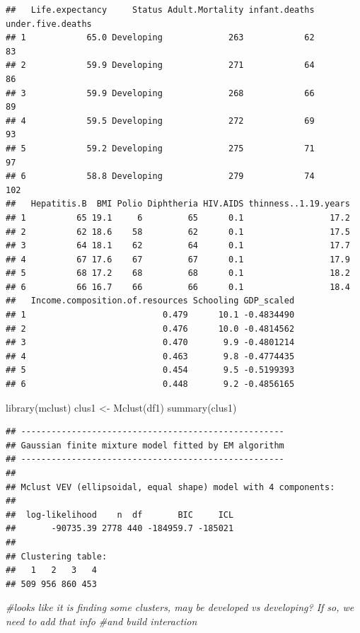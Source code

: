 \documentclass[
]{article}
\newenvironment{Shaded}{\begin{snugshade}}{\end{snugshade}}
\newcommand{\CommentTok}[1]{\textcolor[rgb]{0.56,0.35,0.01}{\textit{#1}}}
\newcommand{\FunctionTok}[1]{\textcolor[rgb]{0.00,0.00,0.00}{#1}}
\newcommand{\NormalTok}[1]{#1}
\newcommand{\OtherTok}[1]{\textcolor[rgb]{0.56,0.35,0.01}{#1}}
\begin{document}
\begin{verbatim}
##   Life.expectancy     Status Adult.Mortality infant.deaths under.five.deaths
## 1            65.0 Developing             263            62                83
## 2            59.9 Developing             271            64                86
## 3            59.9 Developing             268            66                89
## 4            59.5 Developing             272            69                93
## 5            59.2 Developing             275            71                97
## 6            58.8 Developing             279            74               102
##   Hepatitis.B  BMI Polio Diphtheria HIV.AIDS thinness..1.19.years
## 1          65 19.1     6         65      0.1                 17.2
## 2          62 18.6    58         62      0.1                 17.5
## 3          64 18.1    62         64      0.1                 17.7
## 4          67 17.6    67         67      0.1                 17.9
## 5          68 17.2    68         68      0.1                 18.2
## 6          66 16.7    66         66      0.1                 18.4
##   Income.composition.of.resources Schooling GDP_scaled
## 1                           0.479      10.1 -0.4834490
## 2                           0.476      10.0 -0.4814562
## 3                           0.470       9.9 -0.4801214
## 4                           0.463       9.8 -0.4774435
## 5                           0.454       9.5 -0.5199393
## 6                           0.448       9.2 -0.4856165
\end{verbatim}

\begin{Shaded}
\begin{Highlighting}[]
\FunctionTok{library}\NormalTok{(mclust)}
\NormalTok{clus1 }\OtherTok{\textless{}{-}} \FunctionTok{Mclust}\NormalTok{(df1)}
\FunctionTok{summary}\NormalTok{(clus1)}
\end{Highlighting}
\end{Shaded}

\begin{verbatim}
## ---------------------------------------------------- 
## Gaussian finite mixture model fitted by EM algorithm 
## ---------------------------------------------------- 
## 
## Mclust VEV (ellipsoidal, equal shape) model with 4 components: 
## 
##  log-likelihood    n  df       BIC     ICL
##       -90735.39 2778 440 -184959.7 -185021
## 
## Clustering table:
##   1   2   3   4 
## 509 956 860 453
\end{verbatim}

\begin{Shaded}
\begin{Highlighting}[]
\CommentTok{\#looks like it is finding some clusters, may be developed vs developing? If so, we need to add that info }
\CommentTok{\#and build interaction}
\end{Highlighting}
\end{Shaded}
\end{document}
